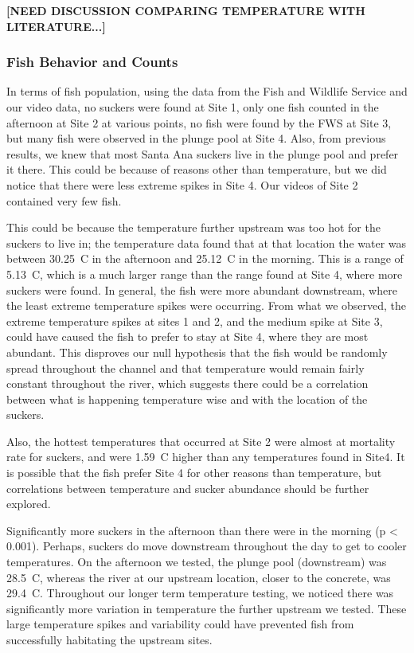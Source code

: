 \documentclass{article}\usepackage[]{graphicx}\usepackage[]{color}
\begin{document}
\textbf{[NEED DISCUSSION COMPARING TEMPERATURE WITH LITERATURE...]}

\subsubsection{Fish Behavior and Counts}

In terms of fish population, using the data from the Fish and Wildlife Service and our video data, no suckers were found at Site 1, only one fish counted in the afternoon at Site 2 at various points, no fish were found by the FWS at Site 3, but many fish were observed in the plunge pool at Site 4. Also, from previous results, we knew that most Santa Ana suckers live in the plunge pool and prefer it there. This could be because of reasons other than temperature, but we did notice that there were less extreme spikes in Site 4. Our videos of Site 2 contained very few fish. 

This could be because the temperature further upstream was too hot for the suckers to live in; the temperature data found that at that location the water was between 30.25\textdegree~C in the afternoon and 25.12\textdegree~C in the morning. This is a range of 5.13\textdegree~C, which is a much larger range than the range found at Site 4, where more suckers were found. In general, the fish were more abundant downstream, where the least extreme temperature spikes were occurring. From what we observed, the extreme temperature spikes at sites 1 and 2, and the medium spike at Site 3, could have caused the fish to prefer to stay at Site 4, where they are most abundant. This disproves our null hypothesis that the fish would be randomly spread throughout the channel and that temperature would remain fairly constant throughout the river, which suggests there could be a correlation between what is happening temperature wise and with the location of the suckers.

Also, the hottest temperatures that occurred at Site 2 were almost at mortality rate for suckers, and were 1.59\textdegree~C higher than any temperatures found in Site4. It is possible that the fish prefer Site 4 for other reasons than temperature, but correlations between temperature and sucker abundance should be further explored.

Significantly more suckers in the afternoon than there were in the morning (p < 0.001).  Perhaps, suckers do move downstream throughout the day to get to cooler temperatures.  On the afternoon we tested, the plunge pool (downstream) was 28.5\textdegree~C, whereas the river at our upstream location, closer to the concrete, was 29.4\textdegree~C. Throughout our longer term temperature testing, we noticed there was significantly more variation in temperature the further upstream we tested. These large temperature spikes and variability could have prevented fish from successfully habitating the upstream sites.
\end{document}

